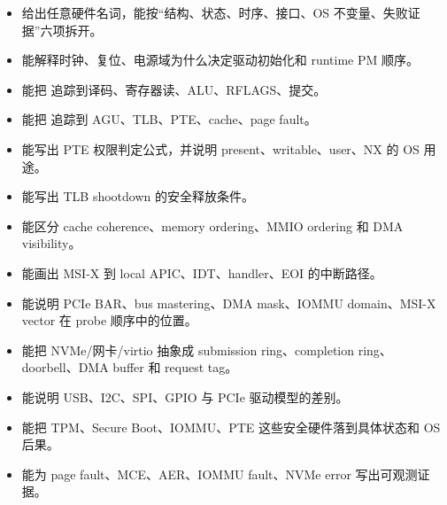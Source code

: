 \begin{rubricbox}
\begin{itemize}
\tightlist
\item 给出任意硬件名词，能按“结构、状态、时序、接口、OS 不变量、失败证据”六项拆开。
\item 能解释时钟、复位、电源域为什么决定驱动初始化和 runtime PM 顺序。
\item 能把  追踪到译码、寄存器读、ALU、RFLAGS、提交。
\item 能把  追踪到 AGU、TLB、PTE、cache、page fault。
\item 能写出 PTE 权限判定公式，并说明 present、writable、user、NX 的 OS 用途。
\item 能写出 TLB shootdown 的安全释放条件。
\item 能区分 cache coherence、memory ordering、MMIO ordering 和 DMA visibility。
\item 能画出 MSI-X 到 local APIC、IDT、handler、EOI 的中断路径。
\item 能说明 PCIe BAR、bus mastering、DMA mask、IOMMU domain、MSI-X vector 在 probe 顺序中的位置。
\item 能把 NVMe/网卡/virtio 抽象成 submission ring、completion ring、doorbell、DMA buffer 和 request tag。
\item 能说明 USB、I2C、SPI、GPIO 与 PCIe 驱动模型的差别。
\item 能把 TPM、Secure Boot、IOMMU、PTE 这些安全硬件落到具体状态和 OS 后果。
\item 能为 page fault、MCE、AER、IOMMU fault、NVMe error 写出可观测证据。
\end{itemize}
\end{rubricbox}
